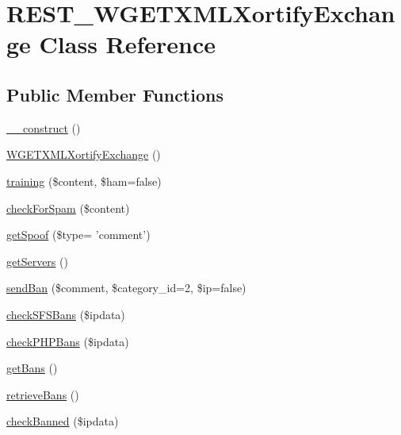 \hypertarget{class_r_e_s_t___w_g_e_t_x_m_l_xortify_exchange}{\section{R\-E\-S\-T\-\_\-\-W\-G\-E\-T\-X\-M\-L\-Xortify\-Exchange Class Reference}
\label{class_r_e_s_t___w_g_e_t_x_m_l_xortify_exchange}
}
\subsection*{Public Member Functions}
\begin{DoxyCompactItemize}
\item 
\hyperlink{class_r_e_s_t___w_g_e_t_x_m_l_xortify_exchange_a095c5d389db211932136b53f25f39685}{\-\_\-\-\_\-construct} ()
\item 
\hyperlink{class_r_e_s_t___w_g_e_t_x_m_l_xortify_exchange_a7d7e5d1092a075a86ff1edb6bd5a4171}{W\-G\-E\-T\-X\-M\-L\-Xortify\-Exchange} ()
\item 
\hyperlink{class_r_e_s_t___w_g_e_t_x_m_l_xortify_exchange_a3b3be735e633ba330c6b5d086aa508cd}{training} (\$content, \$ham=false)
\item 
\hyperlink{class_r_e_s_t___w_g_e_t_x_m_l_xortify_exchange_a7a4f53c3841dc7806455261af557d514}{check\-For\-Spam} (\$content)
\item 
\hyperlink{class_r_e_s_t___w_g_e_t_x_m_l_xortify_exchange_ae7926cba79660f77479306100f492c03}{get\-Spoof} (\$type= 'comment')
\item 
\hyperlink{class_r_e_s_t___w_g_e_t_x_m_l_xortify_exchange_a882f365bc81e207dc2123ef707735e82}{get\-Servers} ()
\item 
\hyperlink{class_r_e_s_t___w_g_e_t_x_m_l_xortify_exchange_a0293acfa4afe0cb5b2816352a35d8ca7}{send\-Ban} (\$comment, \$category\-\_\-id=2, \$ip=false)
\item 
\hyperlink{class_r_e_s_t___w_g_e_t_x_m_l_xortify_exchange_a985a563a84e3e5c54694fcce192bda53}{check\-S\-F\-S\-Bans} (\$ipdata)
\item 
\hyperlink{class_r_e_s_t___w_g_e_t_x_m_l_xortify_exchange_aeb1bf9aaee4718870adbd07333490aaf}{check\-P\-H\-P\-Bans} (\$ipdata)
\item 
\hyperlink{class_r_e_s_t___w_g_e_t_x_m_l_xortify_exchange_aea26db2906896833d32445a698fc4cdc}{get\-Bans} ()
\item 
\hyperlink{class_r_e_s_t___w_g_e_t_x_m_l_xortify_exchange_a4af29af927aae9aada97ef0c2cd08fa1}{retrieve\-Bans} ()
\item 
\hyperlink{class_r_e_s_t___w_g_e_t_x_m_l_xortify_exchange_ae41df0f26620b727f7f63342648f6474}{check\-Banned} (\$ipdata)
\end{DoxyCompactItemize}
